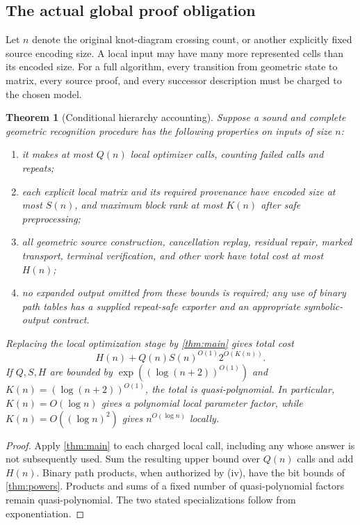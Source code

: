 \documentclass[11pt,letterpaper]{article}
\newtheorem{theorem}{Theorem}[section]
\theoremstyle{definition}
\theoremstyle{remark}
\begin{document}
\subsection{The actual global proof obligation}
Let $n$ denote the original knot-diagram crossing count, or another explicitly fixed source encoding size. A local input may have many more represented cells than its encoded size. For a full algorithm, every transition from geometric state to matrix, every source proof, and every successor description must be charged to the chosen model.

\begin{theorem}[Conditional hierarchy accounting]
\label{thm:conditional}
Suppose a sound and complete geometric recognition procedure has the following properties on inputs of size $n$:
\begin{enumerate}[label=(\roman*)]
\item it makes at most $Q(n)$ local optimizer calls, counting failed calls and repeats;
\item each explicit local matrix and its required provenance have encoded size at most $S(n)$, and maximum block rank at most $K(n)$ after safe preprocessing;
\item all geometric source construction, cancellation replay, residual repair, marked transport, terminal verification, and other work have total cost at most $H(n)$;
\item no expanded output omitted from these bounds is required; any use of binary path tables has a supplied repeat-safe exporter and an appropriate symbolic-output contract.
\end{enumerate}
Replacing the local optimization stage by \cref{thm:main} gives total cost
\begin{equation}
 H(n)+Q(n)S(n)^{O(1)}2^{O(K(n))}.
 \label{eq:global}
\end{equation}
If $Q,S,H$ are bounded by $\exp((\log(n+2))^{O(1)})$ and $K(n)=(\log(n+2))^{O(1)}$, the total is quasi-polynomial. In particular, $K(n)=O(\log n)$ gives a polynomial local parameter factor, while $K(n)=O((\log n)^2)$ gives $n^{O(\log n)}$ locally.
\end{theorem}
\begin{proof}
Apply \cref{thm:main} to each charged local call, including any whose answer is not subsequently used. Sum the resulting upper bound over $Q(n)$ calls and add $H(n)$. Binary path products, when authorized by (iv), have the bit bounds of \cref{thm:powers}. Products and sums of a fixed number of quasi-polynomial factors remain quasi-polynomial. The two stated specializations follow from exponentiation.
\end{proof}
\end{document}
